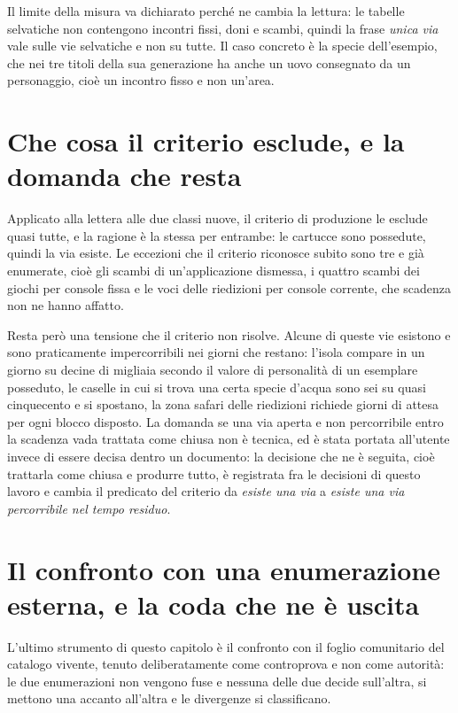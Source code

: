 Il limite della misura va dichiarato perché ne cambia la lettura: le tabelle selvatiche non contengono incontri fissi, doni e scambi, quindi la frase \emph{unica via} vale sulle vie selvatiche e non su tutte. Il caso concreto è la specie dell'esempio, che nei tre titoli della sua generazione ha anche un uovo consegnato da un personaggio, cioè un incontro fisso e non un'area.

\section{Che cosa il criterio esclude, e la domanda che resta}

Applicato alla lettera alle due classi nuove, il criterio di produzione le esclude quasi tutte, e la ragione è la stessa per entrambe: le cartucce sono possedute, quindi la via esiste. Le eccezioni che il criterio riconosce subito sono tre e già enumerate, cioè gli scambi di un'applicazione dismessa, i quattro scambi dei giochi per console fissa e le voci delle riedizioni per console corrente, che scadenza non ne hanno affatto.

Resta però una tensione che il criterio non risolve. Alcune di queste vie esistono e sono praticamente impercorribili nei giorni che restano: l'isola compare in un giorno su decine di migliaia secondo il valore di personalità di un esemplare posseduto, le caselle in cui si trova una certa specie d'acqua sono sei su quasi cinquecento e si spostano, la zona safari delle riedizioni richiede giorni di attesa per ogni blocco disposto. La domanda se una via aperta e non percorribile entro la scadenza vada trattata come chiusa non è tecnica, ed è stata portata all'utente invece di essere decisa dentro un documento: la decisione che ne è seguita, cioè trattarla come chiusa e produrre tutto, è registrata fra le decisioni di questo lavoro e cambia il predicato del criterio da \emph{esiste una via} a \emph{esiste una via percorribile nel tempo residuo}.

\section{Il confronto con una enumerazione esterna, e la coda che ne è uscita}

L'ultimo strumento di questo capitolo è il confronto con il foglio comunitario del catalogo vivente, tenuto deliberatamente come controprova e non come autorità: le due enumerazioni non vengono fuse e nessuna delle due decide sull'altra, si mettono una accanto all'altra e le divergenze si classificano.

